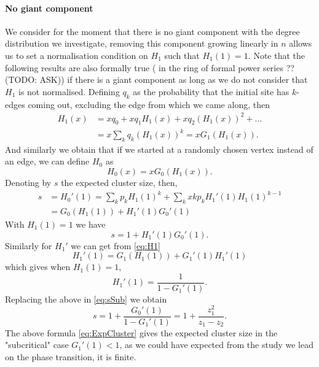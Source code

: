 \paragraph{No giant component}
We consider for the moment that there is no giant component with the degree distribution we investigate, removing this component growing linearly in $n$ allows us to set a normalisation condition on $H_1$ such that $H_1(1) = 1$.
Note that the following results are also formally true ( in the ring of formal power series ?? (TODO: ASK)) if there is a giant component as long as we do not consider that $H_1$ is not normalised.
Defining $q_k$ as the probability that the initial site has $k$-edges coming out, excluding the edge from which we came along, then
\begin{align}\label{eq:H1}
	H_1(x) 	&= xq_0 + xq_1H_1(x) + xq_2 (H_1(x))^2 + \ldots\\
		&= x \sum_k q_k (H_1(x))^k = xG_1(H_1(x)).
\end{align}
And similarly we obtain that if we started at a randomly chosen vertex instead of an edge, we can define $H_0$ as
\begin{equation}\label{eq:defH0}
	H_0(x) = x G_0(H_1(x)).
\end{equation}
Denoting by $s$ the expected cluster size, then,
\begin{align}\label{eq:sH0}
	s &= H_0'(1) =  \sum_k p_k H_1(1)^k + \sum_k x k p_k H_1'(1) H_1(1)^{k-1} \\
		 &= G_0(H_1(1)) + H_1'(1)G_0'(1)
\end{align}
With $H_1(1) = 1$ we have
\begin{equation}\label{eq:sSub}
	s = 1 + H_1'(1)G_0'(1).
\end{equation}
\newline
Similarly for $H_1'$ we can get from \eqref{eq:H1}
\begin{equation}\label{eq:sH1}
	H_1'(1) = G_1(H_1(1)) + G_1'(1)H_1'(1)
\end{equation}
which gives when $H_1(1) = 1$,
\begin{equation}
	H_1'(1) = \frac{1}{1- G_1'(1)}.
\end{equation}
Replacing the above in \eqref{eq:sSub} we obtain
\begin{equation}\label{eq:ExpCluster}
	s = 1 + \frac{G_0'(1)}{1-G_1'(1)} = 1 + \frac{z_1^2}{z_1 - z_2}.
\end{equation}
The above formula \eqref{eq:ExpCluster} gives the expected cluster size in the "subcritical" case $G_1'(1) < 1$, as we could have expected from the study we lead on the phase transition, it is finite.
